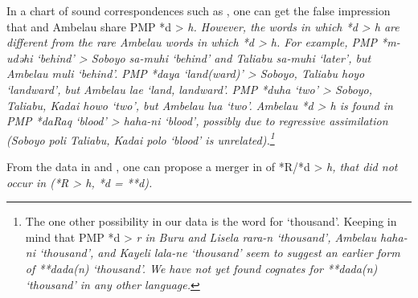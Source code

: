 In a chart of sound correspondences such as ,
one can get the false impression that 
and Ambelau share PMP *d > \it{h}.
However, the words in which  *d > \it{h} are different
from the rare Ambelau words in which *d > \it{h}.
For example, PMP *m-udəhi ‘behind’ > Soboyo \it{sa-muhi} ‘behind’
and Taliabu \it{sa-muhi} ‘later’,
but Ambelau \it{muli} ‘behind’.
PMP *daya ‘land(ward)’ > Soboyo,
Taliabu \it{hoyo} ‘landward’, but Ambelau \it{lae} ‘land, landward’.
PMP *duha ‘two’ > Soboyo,
Taliabu, Kadai \it{howo} ‘two’, but Ambelau \it{lua} ‘two’.
Ambelau *d > \it{h} is found in PMP *daRaq ‘blood’ > \it{haha-ni}
‘blood’, possibly due to regressive assimilation (Soboyo \it{poli} Taliabu,
Kadai \it{polo} ‘blood’ is unrelated).\footnote{
		The one other
		possibility in our data is the word for ‘thousand’.
		Keeping in mind that PMP *d > \it{r} in Buru
		and Lisela \it{rara-n} ‘thousand’,
		Ambelau \it{haha-ni} ‘thousand’, and Kayeli \it{lala-ne} ‘thousand’
		seem to suggest an earlier form of **dada(n) ‘thousand’. We have
		not yet found cognates for **dada(n) ‘thousand’ in any other
		language.} 

From the data in 
and , one can propose a merger in  of
*R/*d > \it{h}, that did not occur in  (*R > \it{h}, *d = **d).

